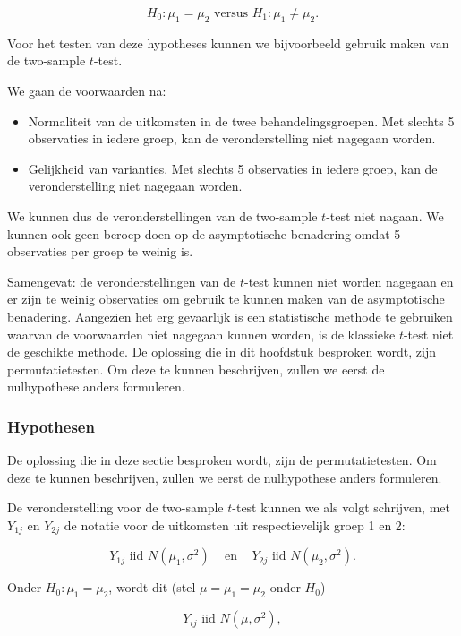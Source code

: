 \documentclass[
  12pt,dutch]{book}
\providecommand{\tightlist}{%
  \setlength{\itemsep}{0pt}\setlength{\parskip}{0pt}}
\theoremstyle{definition}
\theoremstyle{definition}
\theoremstyle{definition}
\theoremstyle{definition}
\theoremstyle{remark}
\begin{document}
\[H_0: \mu_1=\mu_2 \text{ versus } H_1: \mu_1\neq \mu_2.\]

Voor het testen van deze hypotheses kunnen we bijvoorbeeld gebruik maken van de two-sample \(t\)-test.

We gaan de voorwaarden na:

\begin{itemize}
\tightlist
\item
  Normaliteit van de uitkomsten in de twee behandelingsgroepen. Met slechts 5 observaties in iedere groep, kan de veronderstelling niet nagegaan worden.
\item
  Gelijkheid van varianties. Met slechts 5 observaties in iedere groep, kan de veronderstelling niet nagegaan worden.
\end{itemize}

We kunnen dus de veronderstellingen van de two-sample \(t\)-test niet nagaan.
We kunnen ook geen beroep doen op de asymptotische benadering omdat 5 observaties per groep te weinig is.

Samengevat: de veronderstellingen van de \(t\)-test kunnen niet worden nagegaan en er zijn te weinig observaties om gebruik te kunnen maken van de asymptotische benadering. Aangezien het erg gevaarlijk is een statistische methode te gebruiken waarvan de voorwaarden niet nagegaan kunnen worden, is de klassieke \(t\)-test niet de geschikte methode. De oplossing die in dit hoofdstuk besproken wordt, zijn permutatietesten.
Om deze te kunnen beschrijven, zullen we eerst de nulhypothese anders formuleren.

\subsubsection{Hypothesen}\label{hypothesen}

De oplossing die in deze sectie besproken wordt, zijn de permutatietesten.
Om deze te kunnen beschrijven, zullen we eerst de nulhypothese anders formuleren.

De veronderstelling voor de two-sample \(t\)-test kunnen we als volgt schrijven, met \(Y_{1j}\) en \(Y_{2j}\) de notatie voor de uitkomsten uit respectievelijk groep 1 en 2:

\[Y_{1j} \text{ iid } N(\mu_1,\sigma^2) \;\;\;\text{ en }\;\;\; Y_{2j} \text{ iid } N(\mu_2,\sigma^2).\]

Onder \(H_0:\mu_1=\mu_2\), wordt dit (stel \(\mu=\mu_1=\mu_2\) onder \(H_0\))

\[ Y_{ij} \text{ iid } N(\mu,\sigma^2),\]
\end{document}
